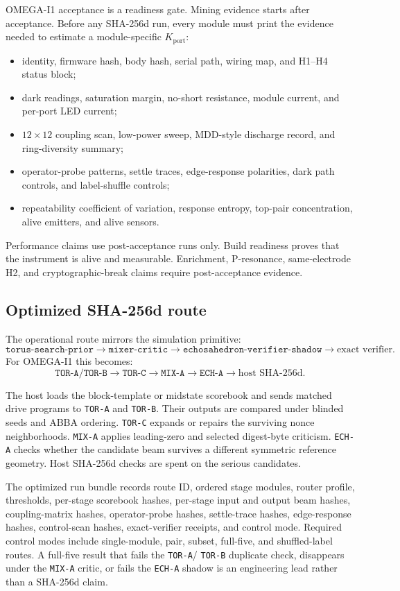 \documentclass[11pt]{article}
\theoremstyle{definition}
\theoremstyle{remark}
\begin{document}
OMEGA-I1 acceptance is a readiness gate. Mining evidence starts after
acceptance. Before any SHA-256d run, every module must print the evidence needed to estimate a
module-specific \(K_{\mathrm{port}}\):

\begin{itemize}
\item identity, firmware hash, body hash, serial path, wiring map, and H1--H4
status block;
\item dark readings, saturation margin, no-short resistance, module current,
and per-port LED current;
\item \(12\times12\) coupling scan, low-power sweep, MDD-style discharge
record, and ring-diversity summary;
\item operator-probe patterns, settle traces, edge-response polarities, dark
path controls, and label-shuffle controls;
\item repeatability coefficient of variation, response entropy, top-pair
concentration, alive emitters, and alive sensors.
\end{itemize}

Performance claims use post-acceptance runs only. Build readiness proves that
the instrument is alive and measurable. Enrichment,
P-resonance, same-electrode H2, and cryptographic-break claims require
post-acceptance evidence.

\subsection{Optimized SHA-256d route}

The operational route mirrors the simulation primitive:
\[
\texttt{torus-search-prior}
\to
\texttt{mixer-critic}
\to
\texttt{echosahedron-verifier-shadow}
\to
\text{exact verifier}.
\]
For OMEGA-I1 this becomes:
\[
\texttt{TOR-A/TOR-B}
\to
\texttt{TOR-C}
\to
\texttt{MIX-A}
\to
\texttt{ECH-A}
\to
\text{host SHA-256d}.
\]

The host loads the block-template or midstate scorebook and sends matched drive
programs to \texttt{TOR-A} and \texttt{TOR-B}. Their outputs are compared under
blinded seeds and ABBA ordering. \texttt{TOR-C} expands or repairs the surviving
nonce neighborhoods. \texttt{MIX-A} applies leading-zero and
selected digest-byte criticism. \texttt{ECH-A} checks whether the candidate beam
survives a different symmetric reference geometry. Host SHA-256d checks are
spent on the serious candidates.

The optimized run bundle records route ID, ordered stage modules, router
profile, thresholds, per-stage scorebook hashes, per-stage input and output beam
hashes, coupling-matrix hashes, operator-probe hashes, settle-trace hashes,
edge-response hashes, control-scan hashes, exact-verifier receipts, and control
mode. Required control modes include single-module, pair, subset, full-five, and
shuffled-label routes. A full-five result that fails the \texttt{TOR-A}/
\texttt{TOR-B} duplicate check, disappears under the \texttt{MIX-A} critic, or
fails the \texttt{ECH-A} shadow is an engineering lead rather than a SHA-256d
claim.
\end{document}
